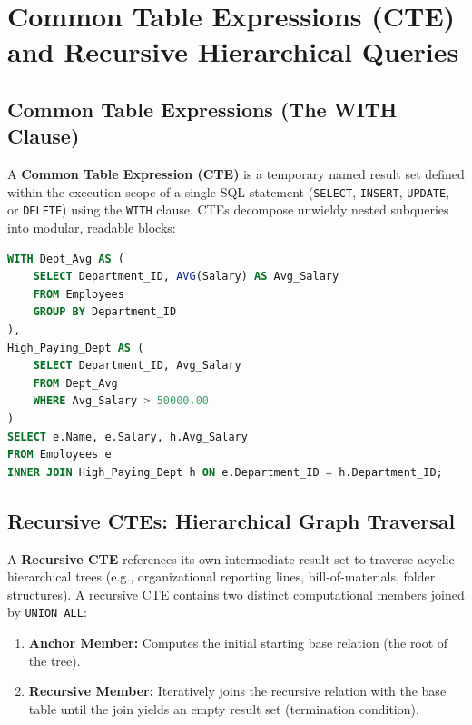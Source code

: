 \section{Common Table Expressions (CTE) and Recursive Hierarchical Queries}
\label{sec:dbms_cte}

\subsection{Common Table Expressions (The WITH Clause)}
A \textbf{Common Table Expression (CTE)} is a temporary named result set defined within the execution scope of a single SQL statement (\texttt{SELECT}, \texttt{INSERT}, \texttt{UPDATE}, or \texttt{DELETE}) using the \texttt{WITH} clause. CTEs decompose unwieldy nested subqueries into modular, readable blocks:
\begin{lstlisting}[language=SQL]
WITH Dept_Avg AS (
    SELECT Department_ID, AVG(Salary) AS Avg_Salary
    FROM Employees
    GROUP BY Department_ID
),
High_Paying_Dept AS (
    SELECT Department_ID, Avg_Salary
    FROM Dept_Avg
    WHERE Avg_Salary > 50000.00
)
SELECT e.Name, e.Salary, h.Avg_Salary
FROM Employees e
INNER JOIN High_Paying_Dept h ON e.Department_ID = h.Department_ID;
\end{lstlisting}

\subsection{Recursive CTEs: Hierarchical Graph Traversal}
A \textbf{Recursive CTE} references its own intermediate result set to traverse acyclic hierarchical trees (e.g., organizational reporting lines, bill-of-materials, folder structures). A recursive CTE contains two distinct computational members joined by \texttt{UNION ALL}:
\begin{enumerate}
    \item \textbf{Anchor Member:} Computes the initial starting base relation (the root of the tree).
    \item \textbf{Recursive Member:} Iteratively joins the recursive relation with the base table until the join yields an empty result set (termination condition).
\end{enumerate}

